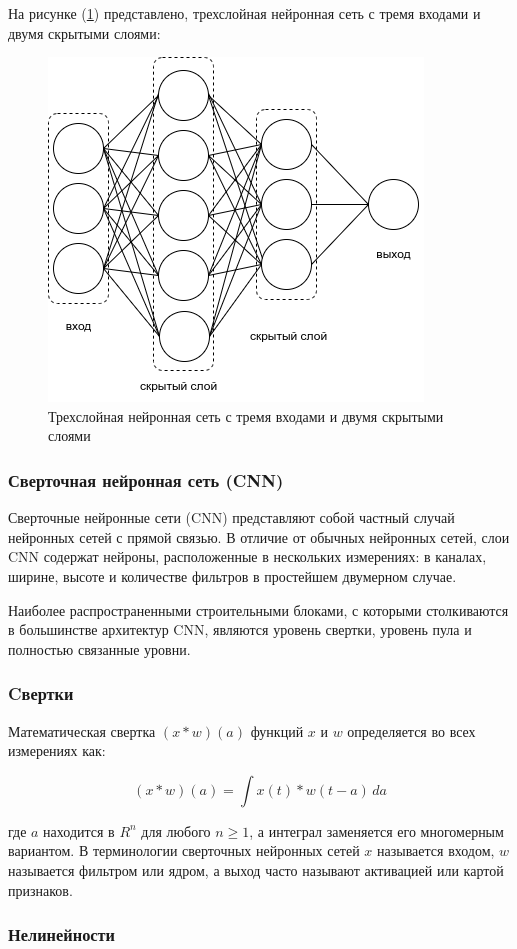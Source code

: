 На рисунке (\ref{fig:neuron-arch}) представлено, трехслойная нейронная сеть с тремя входами и двумя скрытыми слоями: 
\begin{figure}[H]
	\centering
	\includegraphics[width=0.5\linewidth]{images/neural-arch.png}
	\caption{Трехслойная нейронная сеть с тремя входами и двумя скрытыми слоями}
	\label{fig:neuron-arch}
\end{figure}

\subsubsection{Сверточная нейронная сеть (CNN)}

Сверточные нейронные сети (CNN) представляют собой частный случай нейронных сетей с прямой связью. В отличие от обычных нейронных сетей, слои CNN содержат нейроны, расположенные в нескольких измерениях: в каналах, ширине, высоте и количестве фильтров в простейшем двумерном случае.

Наиболее распространенными строительными блоками, с которыми столкиваются в большинстве архитектур CNN, являются уровень свертки, уровень пула и полностью связанные уровни.

\subsubsection*{Cвертки}

Математическая свертка \((x * w)(a)\) функций \(x\) и \(w\) определяется во всех измерениях как:

\[
    (x * w)(a) = \int x(t) * w (t - a) \, da
\]

где \(a\) находится в \(R^{n}\) для любого \(n \ge 1\), а интеграл заменяется его многомерным вариантом. В терминологии сверточных нейронных сетей \(x\) называется входом, \(w\) называется фильтром или ядром, а выход часто называют активацией или картой признаков.

\subsubsection*{Нелинейности}

